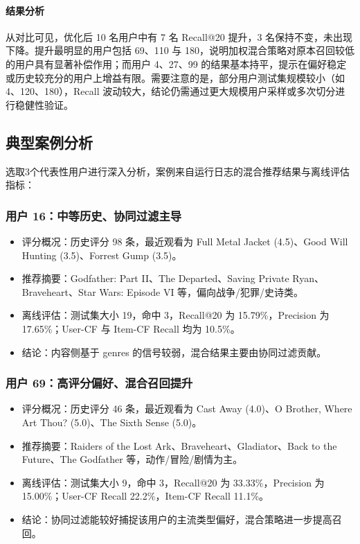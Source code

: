 \paragraph{结果分析}
从对比可见，优化后 10 名用户中有 7 名 Recall@20 提升，3 名保持不变，未出现下降。提升最明显的用户包括 69、110 与 180，说明加权混合策略对原本召回较低的用户具有显著补偿作用；而用户 4、27、99 的结果基本持平，提示在偏好稳定或历史较充分的用户上增益有限。需要注意的是，部分用户测试集规模较小（如 4、120、180），Recall 波动较大，结论仍需通过更大规模用户采样或多次切分进行稳健性验证。

\subsection{典型案例分析}
选取3个代表性用户进行深入分析，案例来自运行日志的混合推荐结果与离线评估指标：

\subsubsection{用户 16：中等历史、协同过滤主导}
\begin{itemize}
  \item 评分概况：历史评分 98 条，最近观看为 Full Metal Jacket (4.5)、Good Will Hunting (3.5)、Forrest Gump (3.5)。
  \item 推荐摘要：Godfather: Part II、The Departed、Saving Private Ryan、Braveheart、Star Wars: Episode VI 等，偏向战争/犯罪/史诗类。
  \item 离线评估：测试集大小 19，命中 3，Recall@20 为 15.79\%，Precision 为 17.65\%；User-CF 与 Item-CF Recall 均为 10.5\%。
  \item 结论：内容侧基于 genres 的信号较弱，混合结果主要由协同过滤贡献。
\end{itemize}

\subsubsection{用户 69：高评分偏好、混合召回提升}
\begin{itemize}
  \item 评分概况：历史评分 46 条，最近观看为 Cast Away (4.0)、O Brother, Where Art Thou? (5.0)、The Sixth Sense (5.0)。
  \item 推荐摘要：Raiders of the Lost Ark、Braveheart、Gladiator、Back to the Future、The Godfather 等，动作/冒险/剧情为主。
  \item 离线评估：测试集大小 9，命中 3，Recall@20 为 33.33\%，Precision 为 15.00\%；User-CF Recall 22.2\%，Item-CF Recall 11.1\%。
  \item 结论：协同过滤能较好捕捉该用户的主流类型偏好，混合策略进一步提高召回。
\end{itemize}

